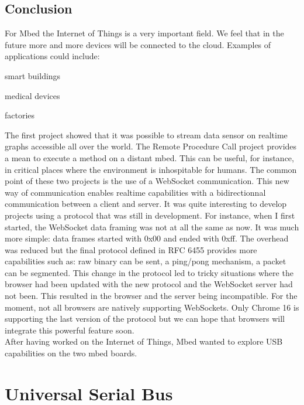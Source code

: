 \documentclass[pdftex,10pt,a4paper]{report}
\newenvironment{packed_item}{
\begin{itemize}
  \setlength{\itemsep}{1pt}
  \setlength{\parskip}{0pt}
  \setlength{\parsep}{0pt}
}{\end{itemize}}
\begin{document}
\section{Conclusion}
For Mbed the Internet of Things is a very important field. We feel that in the future more and more devices will be connected to the cloud. Examples of applications could include:
\begin{packed_item}
	\item smart buildings
	\item medical devices
	\item factories
\end{packed_item}

The first project showed that it was possible to stream data sensor on realtime graphs accessible all over the world. The Remote Procedure Call project provides a mean to execute a method on a distant mbed. This can be useful, for instance, in critical places where the environment is inhospitable for humans. The common point of these two projects is the use of a WebSocket communication. This new way of communication enables realtime capabilities with a bidirectionnal communication between a client and server. It was quite interesting to develop projects using a protocol that was still in development. For instance, when I first started, the WebSocket data framing was not at all the same as now. It was much more simple: data frames started with 0x00 and ended with 0xff. The overhead was reduced but the final protocol defined in RFC 6455 provides more capabilities such as: raw binary can be sent, a ping/pong mechanism, a packet can be segmented. This change in the protocol led to tricky situations where the browser had been updated with the new protocol and the WebSocket server had not been. This resulted in the browser and the server being incompatible. For the moment, not all browsers are natively supporting WebSockets. Only Chrome 16 is supporting the last version of the protocol but we can hope that browsers will integrate this powerful feature soon.\\



After having worked on the Internet of Things, Mbed wanted to explore USB capabilities on the two mbed boards.
	
	
	
	
	
	
	
	
	
	

\chapter{Universal Serial Bus}
\end{document}
